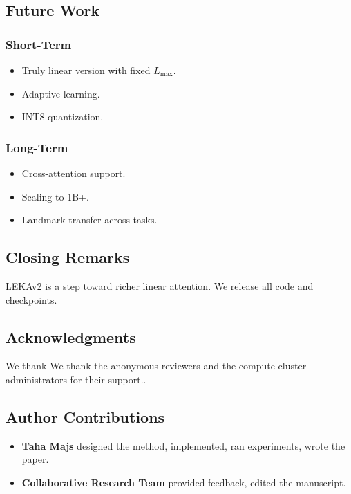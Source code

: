 \subsection{Future Work}

\subsubsection{Short-Term}
\begin{itemize}
\item Truly linear version with fixed $L_\text{max}$.
\item Adaptive   learning.
\item INT8 quantization.

\end{itemize}
\subsubsection{Long-Term}
\begin{itemize}
\item Cross-attention support.
\item Scaling to 1B+.
\item Landmark transfer across tasks.

\end{itemize}
\subsection{Closing Remarks}

LEKAv2 is a step toward richer linear attention. We release all code and 
checkpoints.

\subsection{Acknowledgments}

We thank We thank the anonymous reviewers and the compute cluster administrators for their support..

\subsection{Author Contributions}

\begin{itemize}
\item \textbf{Taha Majs} designed the method, implemented, ran experiments,
  wrote the paper.
\item \textbf{Collaborative Research Team} provided feedback, edited the manuscript.

\end{itemize}
